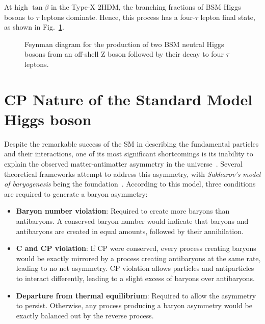 At high $\tan\beta$ in the Type-X 2HDM, the branching fractions of \ac{BSM} Higgs bosons to $\tau$ leptons dominate. Hence, this process has a four-$\tau$ lepton final state, as shown in Fig.~\ref{Figure:Chapter2_Feynman4tau}. 

\begin{figure}[h]
\centering

\caption[Feynman diagram for the production of two Beyond-the-Standard Model neutral Higgs bosons from an off-shell Z boson followed by their decay to four $\tau$ leptons.]{Feynman diagram for the production of two \ac{BSM} neutral Higgs bosons from an off-shell Z boson followed by their decay to four $\tau$ leptons.}
\label{Figure:Chapter2_Feynman4tau}
\end{figure}

\section{CP Nature of the Standard Model Higgs boson}
\label{Section:Chapter2_CP_Nature}
Despite the remarkable success of the \ac{SM} in describing the fundamental particles and their interactions, one of its most significant shortcomings is its inability to explain the observed matter-antimatter asymmetry in the universe~\cite{MatterAntimatter}. Several theoretical frameworks attempt to address this asymmetry, with \textit{Sakharov's model of baryogenesis} being the foundation~\cite{Sakharov}. According to this model, three conditions are required to generate a baryon asymmetry:

\begin{itemize}
    \item \textbf{Baryon number violation}: Required to create more baryons than antibaryons. A conserved baryon number would indicate that baryons and antibaryons are created in equal amounts, followed by their annihilation.
    \item \textbf{C and CP violation}: If CP were conserved, every process creating baryons would be exactly mirrored by a process creating antibaryons at the same rate, leading to no net asymmetry. CP violation allows particles and antiparticles to interact differently, leading to a slight excess of baryons over antibaryons.
    \item \textbf{Departure from thermal equilibrium}: Required to allow the asymmetry to persist. Otherwise, any process producing a baryon asymmetry would be exactly balanced out by the reverse process.
\end{itemize}

